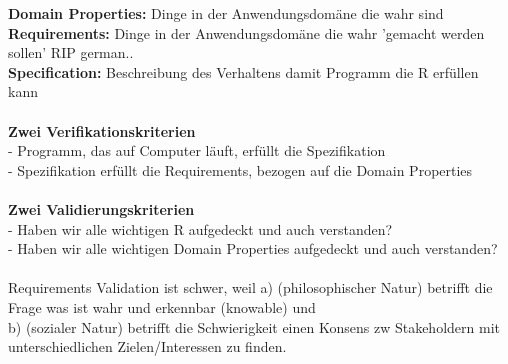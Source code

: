 \textbf{Domain Properties:} Dinge in der Anwendungsdomäne die wahr sind\\
\textbf{Requirements:} Dinge in der Anwendungsdomäne die wahr 'gemacht werden sollen' {\tiny RIP german..}\\
\textbf{Specification:} Beschreibung des Verhaltens damit Programm die R erfüllen kann\\
\\
\textbf{Zwei Verifikationskriterien}\\
- Programm, das auf Computer läuft, erfüllt die Spezifikation\\
- Spezifikation erfüllt die Requirements, bezogen auf die Domain Properties\\
\\
\textbf{Zwei Validierungskriterien}\\
- Haben wir alle wichtigen R aufgedeckt und auch verstanden?\\
- Haben wir alle wichtigen Domain Properties aufgedeckt und auch verstanden?\\
\\
Requirements Validation ist schwer, weil a) (philosophischer Natur) betrifft die Frage was ist wahr und erkennbar (knowable) und \\
b) (sozialer Natur) betrifft die Schwierigkeit einen Konsens zw Stakeholdern mit unterschiedlichen Zielen/Interessen zu finden.


